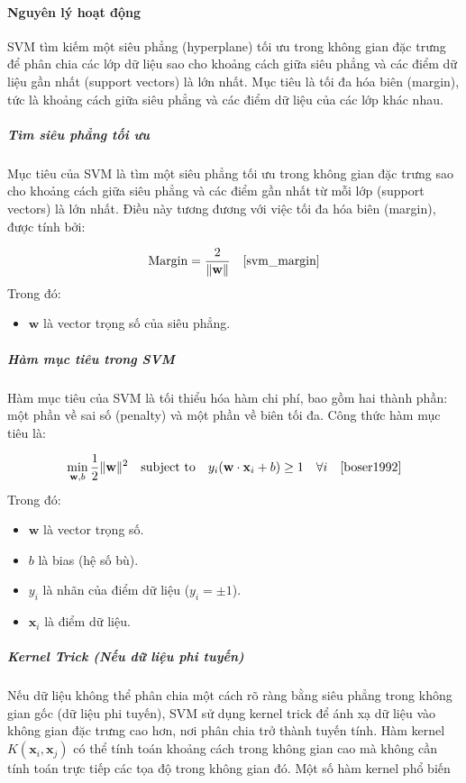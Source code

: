 \documentclass[a4paper,12pt]{article}
\begin{document}
\paragraph{Nguyên lý hoạt động}
\hspace{5mm}SVM tìm kiếm một siêu phẳng (hyperplane) tối ưu trong không gian đặc trưng để phân chia các lớp dữ liệu sao cho khoảng cách giữa siêu phẳng và các điểm dữ liệu gần nhất (support vectors) là lớn nhất. Mục tiêu là tối đa hóa biên (margin), tức là khoảng cách giữa siêu phẳng và các điểm dữ liệu của các lớp khác nhau.

\subparagraph{Tìm siêu phẳng tối ưu}  
\hspace{5mm}Mục tiêu của SVM là tìm một siêu phẳng tối ưu trong không gian đặc trưng sao cho khoảng cách giữa siêu phẳng và các điểm gần nhất từ mỗi lớp (support vectors) là lớn nhất. Điều này tương đương với việc tối đa hóa biên (margin), được tính bởi:

\[
\text{Margin} = \frac{2}{\|\mathbf{w}\|} \quad \text{\cite{svm_margin}}
\]
Trong đó:
\begin{itemize}
    \item \(\mathbf{w}\) là vector trọng số của siêu phẳng.
\end{itemize}

\subparagraph{Hàm mục tiêu trong SVM}  
\hspace{5mm}Hàm mục tiêu của SVM là tối thiểu hóa hàm chi phí, bao gồm hai thành phần: một phần về sai số (penalty) và một phần về biên tối đa. Công thức hàm mục tiêu là:

\[
\min_{\mathbf{w}, b} \frac{1}{2} \|\mathbf{w}\|^2 \quad \text{subject to} \quad y_i (\mathbf{w} \cdot \mathbf{x}_i + b) \geq 1 \quad \forall i
\quad \text{\cite{boser1992}}
\]
Trong đó:
\begin{itemize}
    \item \(\mathbf{w}\) là vector trọng số.
    \item \(b\) là bias (hệ số bù).
    \item \(y_i\) là nhãn của điểm dữ liệu (\(y_i = \pm 1\)).
    \item \(\mathbf{x}_i\) là điểm dữ liệu.
\end{itemize}

\subparagraph{Kernel Trick (Nếu dữ liệu phi tuyến)}  
\hspace{5mm}Nếu dữ liệu không thể phân chia một cách rõ ràng bằng siêu phẳng trong không gian gốc (dữ liệu phi tuyến), SVM sử dụng kernel trick để ánh xạ dữ liệu vào không gian đặc trưng cao hơn, nơi phân chia trở thành tuyến tính. Hàm kernel \(K(\mathbf{x}_i, \mathbf{x}_j)\) có thể tính toán khoảng cách trong không gian cao mà không cần tính toán trực tiếp các tọa độ trong không gian đó. Một số hàm kernel phổ biến \cite{svm_kernel}
\end{document}
